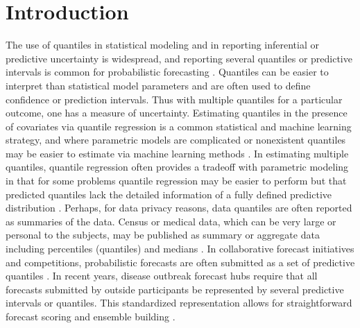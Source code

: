 \documentclass[preprint,12pt,authoryear]{elsarticle}
\newcommand{\1}[1]{\mathds{1}\left[#1\right]}
\newcommand{\jarad}[1]{{\color{red} ?? Jarad: #1}}
\begin{document}


\section{Introduction} \label{seq:intro}

The use of quantiles in statistical modeling and in reporting inferential or 
predictive uncertainty is widespread, and reporting several quantiles or 
predictive intervals is common for probabilistic forecasting 
\cite[]{gneiting2023model}. Quantiles can be easier to interpret than 
statistical model parameters and are often used to define confidence or 
prediction intervals. Thus with multiple quantiles for a particular outcome, 
one has a measure of uncertainty.
Estimating quantiles in the presence of covariates via 
quantile regression is a common
statistical and machine learning strategy, and where parametric models are 
complicated or nonexistent quantiles may be easier to estimate via machine 
learning methods \cite[]{martin2022direct,chung2021beyond, koenker2017quantile, 
koenker1978regression}. In estimating multiple quantiles, quantile regression 
often provides a tradeoff with parametric modeling in that for some problems 
quantile regression may be easier to perform but that predicted quantiles lack 
the detailed information of a fully defined predictive distribution 
\cite[]{pohle2020murphy}. 
Perhaps, for data privacy reasons, data quantiles are often reported as 
summaries of the data.
Census or medical data, which can be very large or personal to the subjects, 
may be published as summary or aggregate data including percentiles (quantiles) 
and medians 
\cite[]{simpson2023interpolating,cdc2022growthcharts,nirwan2020bayesian}. In 
collaborative forecast initiatives and competitions, probabilistic forecasts 
are often submitted as a set of predictive quantiles 
\cite[]{gneiting2023model,hong2016probabilistic}. In recent years, disease 
outbreak forecast hubs require that all forecasts submitted by outside 
participants be represented by  several predictive intervals or quantiles. 
This standardized representation allows for straightforward forecast scoring 
and ensemble building 
\cite[]{mathis2024evaluation,mathis2023flusight,Cramer2022-hub-dataset,
cramer2022evaluation,sherratt2023predictive,bracher2021evaluating}.
 
\end{document}
